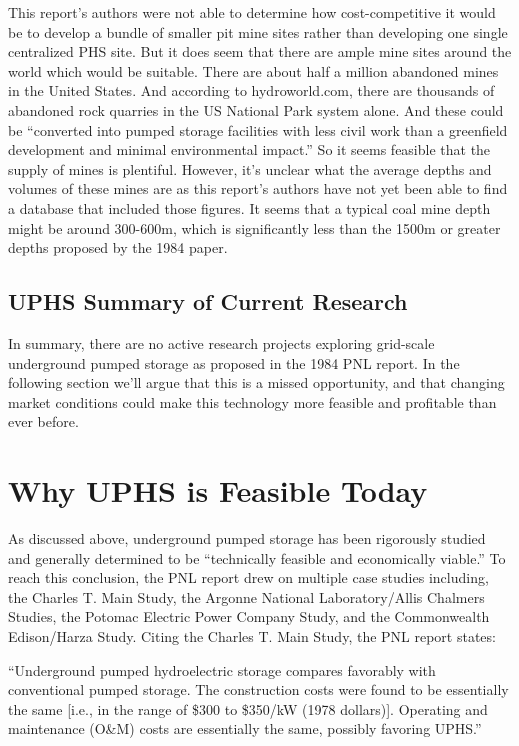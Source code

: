 \documentclass[hidelinks,12pt,a4paper]{article}
\begin{document}
This report's authors were not able to determine how cost-competitive it would be to develop a bundle of smaller pit mine sites rather than developing one single centralized PHS site. But it does seem that there are ample mine sites around the world which would be suitable. There are about half a million abandoned mines in the United States. \cite{MappingInactiveMetalMinesAcrossTheUS} And according to hydroworld.com, there are thousands of abandoned rock quarries in the US National Park system alone. And these could be “converted into pumped storage facilities with less civil work than a greenfield development and minimal environmental impact.” \cite{PumpedStorageElmhurstQuarryProject} So it seems feasible that the supply of mines is plentiful. However, it's unclear what the average depths and volumes of these mines are as this report's authors have not yet been able to find a database that included those figures. It seems that a typical coal mine depth might be around 300-600m, \cite{UndergroundPumpedStorageHydroInAbandonedCoalMines} which is significantly less than the 1500m or greater depths proposed by the 1984 paper.


\subsection{UPHS Summary of Current Research}
In summary, there are no active research projects exploring grid-scale underground pumped storage as proposed in the 1984 PNL report. In the following section we'll argue that this is a missed opportunity, and that changing market conditions could make this technology more feasible and profitable than ever before.

\pagebreak[4]
\section{Why UPHS is Feasible Today}
As discussed above, underground pumped storage has been rigorously studied and generally determined to be “technically feasible and economically viable.” \cite{UndergroundPumpedHydroelectricStorage} To reach this conclusion, the PNL report drew on multiple case studies including, the Charles T. Main Study, the Argonne National Laboratory/Allis Chalmers Studies, the Potomac Electric Power Company Study, and the Commonwealth Edison/Harza Study. Citing the Charles T. Main Study, the PNL report states:

\begin{displayquote}
“Underground pumped hydroelectric storage compares favorably with conventional pumped storage. The construction costs were found to be essentially the same [i.e., in the range of \$300 to \$350/kW (1978 dollars)]. Operating and maintenance (O\&M) costs are essentially the same, possibly favoring UPHS.” \cite{UndergroundPumpedHydroelectricStorage}
\end{displayquote}
\end{document}
